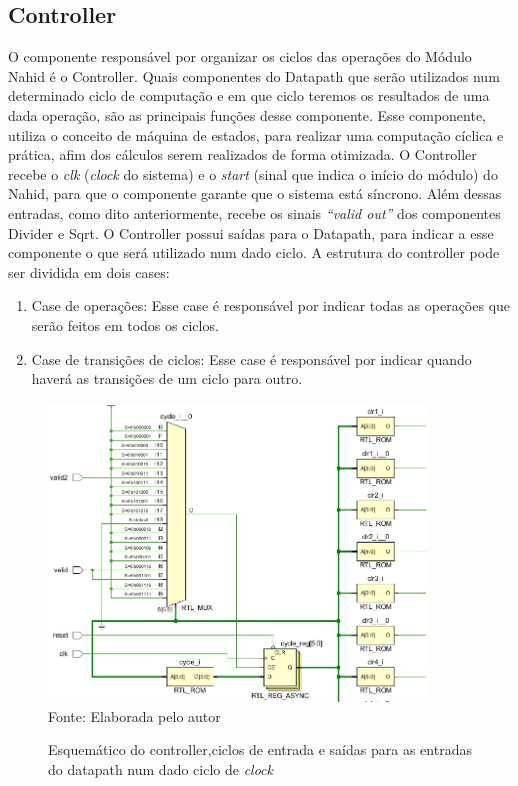 \subsection{Controller}
O componente responsável por organizar os ciclos das operações do Módulo Nahid é o Controller. Quais componentes do Datapath que serão utilizados num determinado ciclo de computação e em que ciclo teremos os resultados de uma dada operação, são as principais funções desse componente. Esse componente, utiliza o conceito de máquina de estados, para realizar uma computação cíclica e prática, afim dos cálculos serem realizados de forma otimizada. O Controller recebe o \textit{clk} (\textit{clock} do sistema) e o \textit{start} (sinal que indica o início do módulo) do Nahid, para que o componente garante que o sistema está síncrono. Além dessas entradas, como dito anteriormente, recebe os sinais \textit{“valid out”} dos componentes Divider e Sqrt. O Controller possui saídas para o Datapath, para indicar a esse componente o que será utilizado num dado ciclo. A estrutura do controller pode ser dividida em dois cases:
\begin{enumerate}
	\item Case de operações: Esse case é responsável por indicar todas as operações que serão feitos em todos os ciclos. 
	\item Case de transições de ciclos: Esse case é responsável por indicar quando haverá as transições de um ciclo para outro.
\end{enumerate} 

\begin{figure}[H]
	\centering
	\caption{Esquemático do controller,ciclos de entrada e saídas para as  entradas do datapath num dado  ciclo de \textit{clock}}
	\includegraphics[width=10cm]{figures/controller.jpg}\\
	{Fonte: Elaborada pelo autor}	
	\label{ciclos}
\end{figure}

